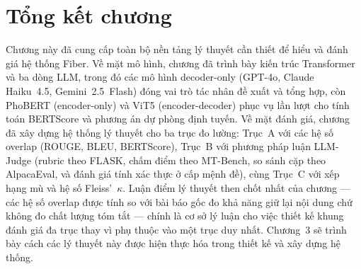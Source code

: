 \section{Tổng kết chương}

Chương này đã cung cấp toàn bộ nền tảng lý thuyết cần thiết để hiểu và đánh giá hệ thống Fiber. Về mặt mô hình, chương đã trình bày kiến trúc Transformer và ba dòng LLM, trong đó các mô hình decoder-only (GPT-4o, Claude Haiku~4.5, Gemini~2.5~Flash) đóng vai trò tác nhân đề xuất và tổng hợp, còn PhoBERT (encoder-only) và ViT5 (encoder-decoder) phục vụ lần lượt cho tính toán BERTScore và phương án dự phòng định tuyến. Về mặt đánh giá, chương đã xây dựng hệ thống lý thuyết cho ba trục đo lường: Trục~A với các hệ số overlap (ROUGE, BLEU, BERTScore), Trục~B với phương pháp luận LLM-Judge (rubric theo FLASK, chấm điểm theo MT-Bench, so sánh cặp theo AlpacaEval, và đánh giá tính xác thực ở cấp mệnh đề), cùng Trục~C với xếp hạng mù và hệ số Fleiss'~$\kappa$. Luận điểm lý thuyết then chốt nhất của chương --- các hệ số overlap được tính so với bài báo gốc đo khả năng giữ lại nội dung chứ không đo chất lượng tóm tắt --- chính là cơ sở lý luận cho việc thiết kế khung đánh giá đa trục thay vì phụ thuộc vào một trục duy nhất. Chương~3 sẽ trình bày cách các lý thuyết này được hiện thực hóa trong thiết kế và xây dựng hệ thống.
